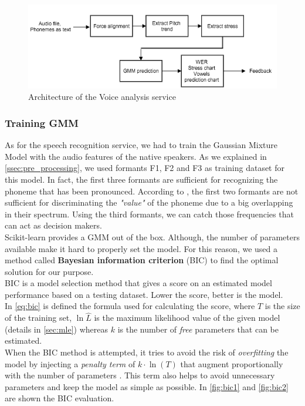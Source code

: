 \begin{figure}[!ht]
	\centering
	\includegraphics[scale=0.6]{Figures/gmm_service.png}
	\caption{Architecture of the Voice analysis service}
	\label{fig:gmm_service}
\end{figure}

\subsubsection{Training GMM}

\noindent As for the speech recognition service, we had to train the Gaussian Mixture Model with the audio features of the native speakers. As we explained in \ref{ssec:pre_processing}, we used formants F1, F2 and F3 as training dataset for this model. In fact, the first three formants are sufficient for recognizing the phoneme that has been pronounced. According to \cite{prica2010recognition}, the first two formants are not sufficient for discriminating the \textit{"value"} of the phoneme due to a big overlapping in their spectrum. Using the third formants, we can catch those frequencies that can act as decision makers. \\

\noindent Scikit-learn provides a GMM out of the box. Although, the number of parameters available make it hard to properly set the model. For this reason, we used a method called \textbf{Bayesian information criterion} (BIC) to find the optimal solution for our purpose. \\

\noindent BIC is a model selection method that gives a score on an estimated model performance based on a testing dataset. Lower the score, better is the model.\\
\noindent In \ref{eq:bic} is defined the formula used for calculating the score, where $T$ is the size of the training set, $\ln{\hat L}$ is the maximum likelihood value of the given model (details in \ref{sec:mle}) whereas $k$ is the number of \textit{free} parameters that can be estimated. \\
\noindent When the BIC method is attempted, it tries to avoid the risk of \textit{overfitting} the model by injecting a \textit{penalty term} of $k \cdot \ln(T)$ that augment proportionally with the number of parameters \cite{bic_info}. This term also helps to avoid unnecessary parameters and keep the model as simple as possible. In \ref{fig:bic1} and \ref{fig:bic2} are shown the BIC evaluation.


